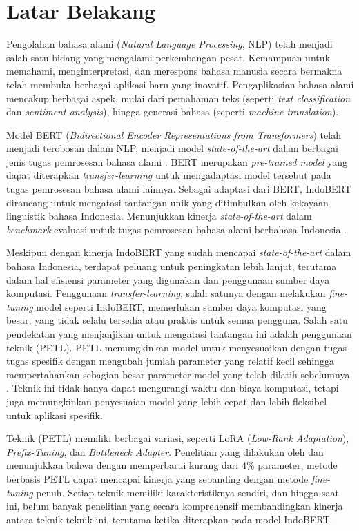 \section{Latar Belakang}
\label{sec:latar-belakang}

Pengolahan bahasa alami (\textit{Natural Language Processing}, NLP) telah menjadi salah satu bidang yang mengalami perkembangan pesat. Kemampuan untuk memahami, menginterpretasi, dan merespons bahasa manusia secara bermakna telah membuka berbagai aplikasi baru yang inovatif. Pengaplikasian bahasa alami mencakup berbagai aspek, mulai dari pemahaman teks (seperti \textit{text classification} dan \textit{sentiment analysis}), hingga generasi bahasa (seperti \textit{machine translation}).

Model BERT (\textit{Bidirectional Encoder Representations from Transformers}) telah menjadi terobosan dalam NLP, menjadi model \textit{state-of-the-art} dalam berbagai jenis tugas pemrosesan bahasa alami \parencite{bert}. BERT merupakan \textit{pre-trained model} yang dapat diterapkan \textit{transfer-learning} untuk mengadaptasi model tersebut pada tugas pemrosesan bahasa alami lainnya. Sebagai adaptasi dari BERT, IndoBERT dirancang untuk mengatasi tantangan unik yang ditimbulkan oleh kekayaan linguistik bahasa Indonesia. Menunjukkan kinerja \textit{state-of-the-art} dalam \textit{benchmark} evaluasi untuk tugas pemrosesan bahasa alami berbahasa Indonesia \parencite{indobert}.

Meskipun dengan kinerja IndoBERT yang sudah mencapai \textit{state-of-the-art} dalam bahasa Indonesia, terdapat peluang untuk peningkatan lebih lanjut, terutama dalam hal efisiensi parameter yang digunakan dan penggunaan sumber daya komputasi. Penggunaan \textit{transfer-learning}, salah satunya dengan melakukan \textit{fine-tuning} model seperti IndoBERT, memerlukan sumber daya komputasi yang besar, yang tidak selalu tersedia atau praktis untuk semua pengguna. Salah satu pendekatan yang menjanjikan untuk mengatasi tantangan ini adalah penggunaan teknik \PETL (PETL). PETL memungkinkan model untuk menyesuaikan dengan tugas-tugas spesifik dengan mengubah jumlah parameter yang relatif kecil sehingga mempertahankan sebagian besar parameter model yang telah dilatih sebelumnya \parencite{adapter}. Teknik ini tidak hanya dapat mengurangi waktu dan biaya komputasi, tetapi juga memungkinkan penyesuaian model yang lebih cepat dan lebih fleksibel untuk aplikasi spesifik. 

Teknik \PETL (PETL) memiliki berbagai variasi, seperti LoRA (\textit{Low-Rank Adaptation}), \textit{Prefix-Tuning}, dan \textit{Bottleneck Adapter}. Penelitian yang dilakukan oleh \citeauthor{adapter} \parencite{adapter} dan \citeauthor{uvpl} \parencite{uvpl} menunjukkan bahwa dengan memperbarui kurang dari 4\% parameter, metode berbasis PETL dapat mencapai kinerja yang sebanding dengan metode \textit{fine-tuning} penuh. Setiap teknik memiliki karakteristiknya sendiri, dan hingga saat ini, belum banyak penelitian yang secara komprehensif membandingkan kinerja antara teknik-teknik ini, terutama ketika diterapkan pada model IndoBERT. 

